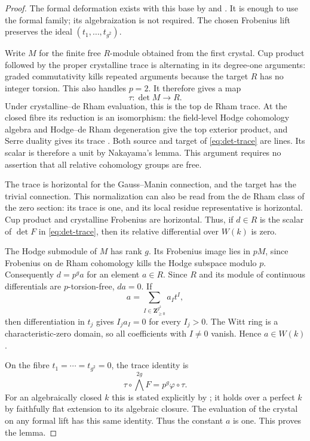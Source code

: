\documentclass[11pt]{article}
\theoremstyle{definition}\newtheorem{definition}[theorem]{Definition}
\theoremstyle{remark}\newtheorem{remark}[theorem]{Remark}
\newcommand{\ZZ}{\mathbf Z}
\begin{document}
\begin{proof}
The formal deformation exists with this base by \citet[Corollary~4.8(i), pp.~180--181]{Illusie} and \citet[Theorem~1.2.1, pp.~143--146]{Katz}. It is enough to use the formal family; its algebraization is not required. The chosen Frobenius lift preserves the ideal $(t_1,\ldots,t_{g^2})$.

Write $M$ for the finite free $R$-module obtained from the first crystal. Cup product followed by the proper crystalline trace is alternating in its degree-one arguments: graded commutativity kills repeated arguments because the target $R$ has no integer torsion. This also handles $p=2$. It therefore gives a map
\begin{equation}\label{eq:det-trace}
 \tau:\det M\longrightarrow R.
\end{equation}
Under crystalline--de Rham evaluation, this is the top de Rham trace. At the closed fibre its reduction is an isomorphism: the field-level Hodge cohomology algebra and Hodge--de Rham degeneration give the top exterior product, and Serre duality gives its trace \citep[Proposition~7.27 and Corollaries~7.29--7.30, pp.~108--109]{EGM}. Both source and target of \eqref{eq:det-trace} are lines. Its scalar is therefore a unit by Nakayama's lemma. This argument requires no assertion that all relative cohomology groups are free.

The trace is horizontal for the Gauss--Manin connection, and the target has the trivial connection. This normalization can also be read from the de Rham class of the zero section: its trace is one, and its local residue representative is horizontal. Cup product and crystalline Frobenius are horizontal. Thus, if $d\in R$ is the scalar of $\det F$ in \eqref{eq:det-trace}, then its relative differential over $W(k)$ is zero.

The Hodge submodule of $M$ has rank $g$. Its Frobenius image lies in $pM$, since Frobenius on de Rham cohomology kills the Hodge subspace modulo $p$. Consequently $d=p^g a$ for an element $a\in R$. Since $R$ and its module of continuous differentials are $p$-torsion-free, $da=0$. If
\[
 a=\sum_{I\in\ZZ_{\ge0}^{g^2}} a_I t^I,
\]
then differentiation in $t_j$ gives $I_j a_I=0$ for every $I_j>0$. The Witt ring is a characteristic-zero domain, so all coefficients with $I\ne0$ vanish. Hence $a\in W(k)$.

On the fibre $t_1=\cdots=t_{g^2}=0$, the trace identity is
\[
 \tau\circ\bigwedge^{2g}F=p^g\varphi\circ\tau.
\]
For an algebraically closed $k$ this is stated explicitly by \citet[\S6, immediately before Definition~6.1, p.~59]{Ogus1979}; it holds over a perfect $k$ by faithfully flat extension to its algebraic closure. The evaluation of the crystal on any formal lift has this same identity. Thus the constant $a$ is one. This proves the lemma.
\end{proof}
\end{document}

